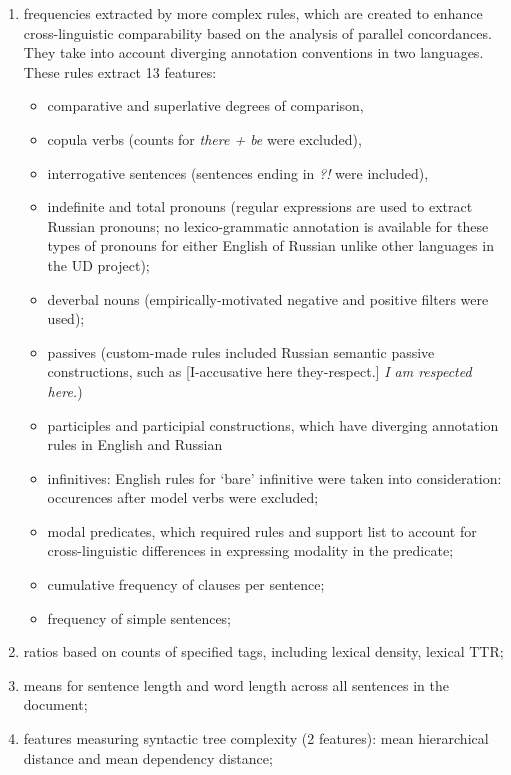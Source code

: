 \begin{enumerate}
	\item frequencies extracted by more complex rules, which are created to enhance cross-linguistic comparability based on the analysis of parallel concordances. They take into account diverging annotation conventions in two languages. These rules extract 13 features: 
	\begin{itemize}\compresslist{}
		\item comparative and superlative degrees of comparison,
		\item copula verbs (counts for \textit{there + be} were excluded), 
		\item interrogative sentences (sentences ending in \textit{?!} were included),
		\item indefinite and total pronouns (regular expressions are used to extract Russian pronouns; no lexico-grammatic annotation is available for these types of pronouns for either English of Russian unlike other languages in the UD project); 
		\item deverbal nouns (empirically-motivated negative and positive filters were used);
		\item passives (custom-made rules included Russian semantic passive constructions, such as  [I-accusative here they-respect.] \textit{I am respected here.}) %
		\item participles and participial constructions, which have diverging annotation rules in English and Russian 
		\item infinitives: English rules for `bare' infinitive were taken into consideration: occurences after model verbs were excluded;
		\item modal predicates, which required rules and support list to account for cross-linguistic differences in expressing modality in the predicate;
		\item cumulative frequency of clauses per sentence;
		\item frequency of simple sentences;
	\end{itemize}

	\item ratios based on counts of specified tags, including lexical density, lexical TTR;
	
	\item means for sentence length and word length across all sentences in the document; 
	
	\item features measuring syntactic tree complexity (2 features): mean hierarchical distance and mean dependency distance;
	

\end{enumerate}
